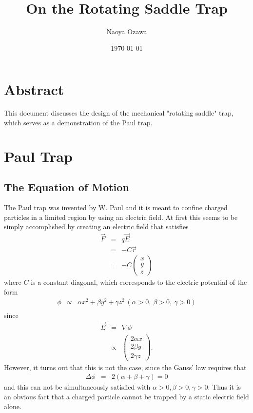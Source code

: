 \documentclass{article}
\title{On the Rotating Saddle Trap}
\author{Naoya Ozawa}
\date{\today}
\begin{document}
\maketitle

\section{Abstract}
This document discusses the design of the mechanical "rotating saddle" trap\cite{}, which serves as a demonstration of the Paul trap\cite{PaulNobel}.

\section{Paul Trap}

\subsection{The Equation of Motion}
The Paul trap was invented by W. Paul and it is meant to confine charged particles in a limited region by using an electric field. At first this seems to be simply accomplished by creating an electric field that satisfies
\begin{eqnarray*}
\vec{F} & = & q \vec{E} \\
& = & -C \vec{r} \\
& = & -C \left(
\begin{array}{c}
	x \\
	y \\
	z
\end{array} \right)
\end{eqnarray*}
where $C$ is a constant diagonal, which corresponds to the electric potential of the form
\begin{eqnarray*}
\phi & \propto & \alpha x^2 + \beta y^2 + \gamma z^2 \, (\alpha>0,\ \beta>0,\ \gamma>0) \\
\end{eqnarray*}
since
\begin{eqnarray*}
\vec{E} & = & \nabla \phi \\
& \propto & \left(
\begin{array}{c}
	2\alpha x \\
	2\beta y \\
	2\gamma z
\end{array} \right).
\end{eqnarray*}
However, it turns out that this is not the case, since the Gauss' law requires that
\begin{eqnarray*}
\Delta \phi & = & 2 (\alpha + \beta + \gamma) = 0
\end{eqnarray*}
and this can not be simultaneously satisfied with $\alpha>0, \beta>0, \gamma>0$. Thus it is an obvious fact that a charged particle cannot be trapped by a static electric field alone. \\
\end{document}
